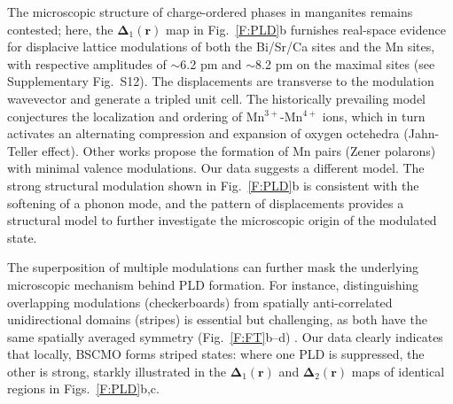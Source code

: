 \documentclass[12pt]{article}
\begin{document}
The microscopic structure of charge-ordered phases in manganites remains contested\cite{goff2004,daoud2002,daoud2008,johnstone2012};
here, the $\mathbf{\Delta}_1(\mathbf{r})$ map in Fig.~\ref{F:PLD}b furnishes real-space evidence for displacive lattice modulations of both the Bi/Sr/Ca sites and the Mn sites, with respective amplitudes of $\sim$6.2 pm and $\sim$8.2 pm on the maximal sites (see Supplementary Fig.~S12).
The displacements are transverse to the modulation wavevector and generate a tripled unit cell.
The historically prevailing model conjectures the localization and ordering of Mn$^{3+}$-Mn$^{4+}$ ions, which in turn activates an alternating compression and expansion of oxygen octehedra (Jahn-Teller effect)\cite{mori1998pairing}.
Other works propose the formation of Mn pairs (Zener polarons) with minimal valence modulations\cite{daoud2002,Louden2007}.
Our data suggests a different model.
The strong structural modulation shown in Fig.~\ref{F:PLD}b is consistent with the softening of a phonon mode, and the pattern of displacements provides a structural model to further investigate the microscopic origin of the modulated state.


The superposition of multiple modulations can further mask the underlying microscopic mechanism behind PLD formation. 
For instance, distinguishing overlapping modulations \linebreak (checkerboards) from spatially anti-correlated unidirectional domains (stripes) is essential but challenging, as both have the same spatially averaged symmetry (Fig.~\ref{F:FT}b--d) \cite{cox2008very,Comin2015,Kajimoto2003,Robertson2006,DelMaestro2006}.
Our data clearly indicates that locally, BSCMO forms striped states: where one PLD is suppressed, the other is strong, starkly illustrated in the $\mathbf{\Delta}_1(\mathbf{r})$ and $\mathbf{\Delta}_2(\mathbf{r})$ maps of identical regions in Figs.~\ref{F:PLD}b,c.
\end{document}
